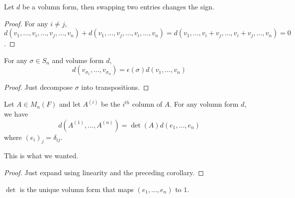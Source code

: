 \begin{lemma}
    Let $d$ be a volumn form, then swapping two entries changes the sign.
\end{lemma}
\begin{proof}
    For any $i\neq j$, $d(v_1,\ldots,v_i,\ldots,v_j,\ldots,v_n)+ d(v_1,\ldots,v_j,\ldots,v_i,\ldots,v_n)= d(v_1,\ldots,v_i+v_j,\ldots,v_i+v_j,\ldots,v_n)=0$.
\end{proof}
\begin{corollary}
    For any $\sigma\in S_n$ and volume form $d$,
    $$d(v_{\sigma_1},\ldots,v_{\sigma_n})=\epsilon(\sigma)d(v_1,\ldots,v_n)$$
\end{corollary}
\begin{proof}
    Just decompose $\sigma$ into transpositions.
\end{proof}
\begin{theorem}
    Let $A\in M_n(F)$ and let $A^{(i)}$ be the $i^{th}$ column of $A$.
    For any volumn form $d$, we have
    $$d(A^{(1)},\ldots,A^{(n)})=\det(A)d(e_1,\ldots,e_n)$$
    where $(e_i)_j=\delta_{ij}$.
\end{theorem}
This is what we wanted.
\begin{proof}
    Just expand using linearity and the preceding corollary.
\end{proof}
\begin{corollary}
    $\det$ is the unique volumn form that maps $(e_1,\ldots,e_n)$ to $1$.
\end{corollary}